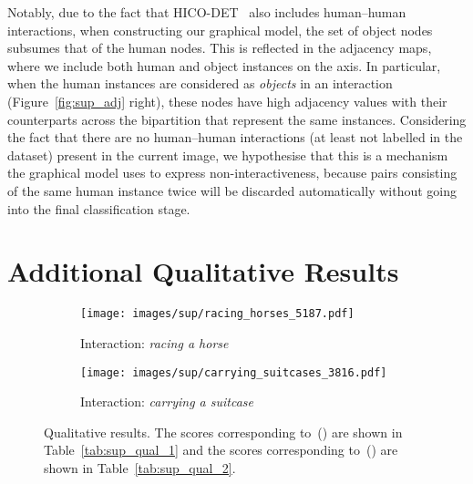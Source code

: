 \documentclass[10pt,twocolumn,letterpaper]{article}
\begin{document}
Notably, due to the fact that HICO-DET~\cite{chao2018} also includes human--human interactions, when constructing our graphical model, the set of object nodes subsumes that of the human nodes. This is reflected in the adjacency maps, where we include both human and object instances on the  axis. In particular, when the human instances are considered as \textit{objects} in an interaction (Figure~\ref{fig:sup_adj} right), these nodes have high adjacency values with their counterparts across the bipartition that represent the same instances. Considering the fact that there are no human--human interactions (at least not labelled in the dataset) present in the current image, we hypothesise that this is a mechanism the graphical model uses to express non-interactiveness, because pairs consisting of the same human instance twice will be discarded automatically without going into the final classification stage.
 

\section{Additional Qualitative Results}

\begin{figure}[t!]\centering
	\begin{subfigure}[t]{\linewidth}
	   \centering
		\texttt{[image: images/sup/racing\_horses\_5187.pdf]}\caption{Interaction: \textit{racing a horse}}
	   \label{fig:sup_qual_1}
	\end{subfigure}
	\begin{subfigure}[t]{\linewidth}
		\centering
		 \texttt{[image: images/sup/carrying\_suitcases\_3816.pdf]}\caption{Interaction: \textit{carrying a suitcase}}
		\label{fig:sup_qual_2}
	 \end{subfigure}
	 \newline
	 \caption{Qualitative results. The scores corresponding to~() are shown in Table~\ref{tab:sup_qual_1} and the scores corresponding to~() are shown in Table~\ref{tab:sup_qual_2}.}
	 \label{fig:sup_qualitative}
 \end{figure}
\end{document}
